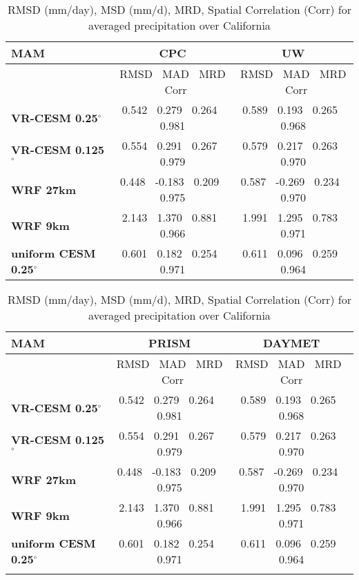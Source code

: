 \documentclass[ms]{agutexSI}
\begin{document}
\begin{table}
\begin{center}
\caption{RMSD (mm/day), MSD (mm/d), MRD, Spatial Correlation (Corr) for averaged precipitation over California}
\begin{tabular}{lcc}
\hline \textbf{MAM} & \textbf{CPC}  & \textbf{UW} \\
\hline $    $ & RMSD $\ $ MAD $\ $ MRD $\ $ Corr & RMSD $\ $ MAD $\ $ MRD $\ $ Corr \\
\hline \textbf{VR-CESM 0.25$^\circ$} & 0.542 $\ $ 0.279 $\ $ 0.264 $\ $ 0.981 & 0.589 $\ $ 0.193 $\ $ 0.265 $\ $ 0.968 \\
\textbf{VR-CESM 0.125$^\circ$} & 0.554 $\ $ 0.291 $\ $ 0.267 $\ $ 0.979 & 0.579 $\ $ 0.217 $\ $ 0.263 $\ $ 0.970\\
\textbf{WRF 27km} & 0.448 $\ $ -0.183 $\ $ 0.209 $\ $ 0.975 & 0.587 $\ $ -0.269 $\ $ 0.234 $\ $ 0.970 \\
\textbf{WRF 9km} & 2.143 $\ $ 1.370 $\ $ 0.881 $\ $ 0.966 & 1.991 $\ $ 1.295 $\ $ 0.783 $\ $ 0.971 \\
\textbf{uniform CESM 0.25$^\circ$} & 0.601 $\ $ 0.182 $\ $ 0.254 $\ $ 0.971 & 0.611 $\ $ 0.096 $\ $ 0.259 $\ $ 0.964 \\
\hline
\end{tabular}

\begin{tabular}{lcc}
\hline \textbf{MAM} & \textbf{PRISM} & \textbf{DAYMET} \\
\hline $    $ & RMSD $\ $ MAD $\ $ MRD $\ $ Corr & RMSD $\ $ MAD $\ $ MRD $\ $ Corr \\
\hline \textbf{VR-CESM 0.25$^\circ$} & 0.542 $\ $ 0.279 $\ $ 0.264 $\ $ 0.981 & 0.589 $\ $ 0.193 $\ $ 0.265 $\ $ 0.968 \\
\textbf{VR-CESM 0.125$^\circ$} & 0.554 $\ $ 0.291 $\ $ 0.267 $\ $ 0.979 & 0.579 $\ $ 0.217 $\ $ 0.263 $\ $ 0.970 \\
\textbf{WRF 27km} & 0.448 $\ $ -0.183 $\ $ 0.209 $\ $ 0.975 & 0.587 $\ $ -0.269 $\ $ 0.234 $\ $ 0.970 \\
\textbf{WRF 9km} & 2.143 $\ $ 1.370 $\ $ 0.881 $\ $ 0.966 & 1.991 $\ $ 1.295 $\ $ 0.783 $\ $ 0.971 \\
\textbf{uniform CESM 0.25$^\circ$} & 0.601 $\ $ 0.182 $\ $ 0.254 $\ $ 0.971 & 0.611 $\ $ 0.096 $\ $ 0.259 $\ $ 0.964 \\
\hline
\\
\end{tabular}


\end{center}
\end{table}
\end{document}
